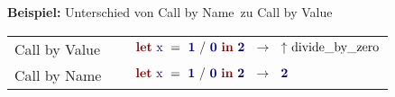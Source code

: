 {
  {\bf Beispiel:} Unterschied von \glqq Call by Name\grqq\ zu \glqq Call by Value\grqq\\[5mm]
  \begin{tabular}{ll}
     Call by Value $\quad$      & $\ExprLet{\ExprIdentifier{x}}{}
                                  {\ExprInfixOperation{/}{\ExprConstant{1}}{\ExprConstant{0}}}
                                  {\ExprConstant{2}} \ \ \to \ \ \ExprExn{divide\_by\_zero}$ \\[3mm]
     Call by Name $\quad$       & $\ExprLet{\ExprIdentifier{x}}{}
                                  {\ExprInfixOperation{/}{\ExprConstant{1}}{\ExprConstant{0}}}
                                  {\ExprConstant{2}} \ \ \to \ \ \ExprConstant{2}$ \\[3mm]
  \end{tabular}
}